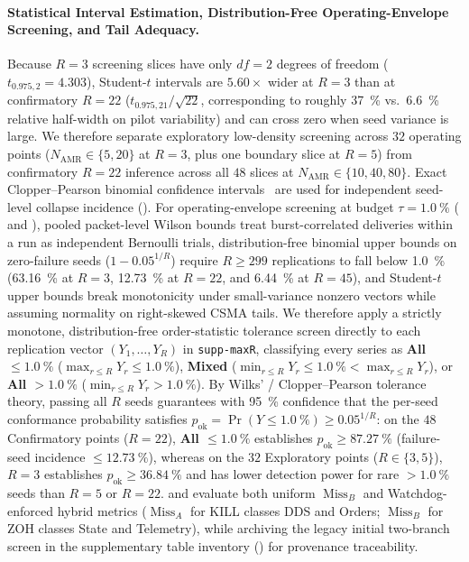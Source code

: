 \documentclass[11pt,a4paper]{article}
\newcommand{\Namr}{\ensuremath{N_{\mathrm{AMR}}}}
\newcommand{\MissA}{\ensuremath{\operatorname{Miss}_A}}
\newcommand{\MissB}{\ensuremath{\operatorname{Miss}_B}}
\begin{document}
\paragraph{Statistical Interval Estimation, Distribution-Free Operating-Envelope Screening, and Tail Adequacy.}
Because $R=3$ screening slices have only $df=2$ degrees of freedom ($t_{0.975,2} = 4.303$), Student-$t$ intervals are $5.60\times$ wider at $R=3$ than at confirmatory $R=22$ ($t_{0.975,21}/\sqrt{22}$, corresponding to roughly \qty{37}{\percent} vs.\ \qty{6.6}{\percent} relative half-width on pilot variability) and can cross zero when seed variance is large. We therefore separate exploratory low-density screening across $32$ operating points ($\Namr \in \{5, 20\}$ at $R=3$, plus one boundary slice at $R=5$) from confirmatory $R=22$ inference across all $48$ slices at $\Namr \in \{10, 40, 80\}$. Exact Clopper--Pearson binomial confidence intervals~\cite{clopper1934use} are used for independent seed-level collapse incidence (). For operating-envelope screening at budget $\tau = \qty{1.0}{\percent}$ ( and ), pooled packet-level Wilson bounds treat burst-correlated deliveries within a run as independent Bernoulli trials, distribution-free binomial upper bounds on zero-failure seeds ($1 - 0.05^{1/R}$) require $R \ge 299$ replications to fall below \qty{1.0}{\percent} (\qty{63.16}{\percent} at $R=3$, \qty{12.73}{\percent} at $R=22$, and \qty{6.44}{\percent} at $R=45$), and Student-$t$ upper bounds break monotonicity under small-variance nonzero vectors while assuming normality on right-skewed CSMA tails. We therefore apply a strictly monotone, distribution-free order-statistic tolerance screen directly to each replication vector $(Y_1, \dots, Y_R)$ in \texttt{supp-maxR}, classifying every series as \textbf{All $\le \qty{1.0}{\percent}$} ($\max_{r \le R} Y_r \le \qty{1.0}{\percent}$), \textbf{Mixed} ($\min_{r \le R} Y_r \le \qty{1.0}{\percent} < \max_{r \le R} Y_r$), or \textbf{All $> \qty{1.0}{\percent}$} ($\min_{r \le R} Y_r > \qty{1.0}{\percent}$). By Wilks' / Clopper--Pearson tolerance theory, passing all $R$ seeds guarantees with \qty{95}{\percent} confidence that the per-seed conformance probability satisfies $p_{\mathrm{ok}} = \Pr(Y \le \qty{1.0}{\percent}) \ge 0.05^{1/R}$: on the $48$ Confirmatory points ($R=22$), \textbf{All $\le \qty{1.0}{\percent}$} establishes $p_{\mathrm{ok}} \ge \qty{87.27}{\percent}$ (failure-seed incidence $\le \qty{12.73}{\percent}$), whereas on the $32$ Exploratory points ($R \in \{3, 5\}$), $R=3$ establishes $p_{\mathrm{ok}} \ge \qty{36.84}{\percent}$ and has lower detection power for rare $> \qty{1.0}{\percent}$ seeds than $R=5$ or $R=22$.  and  evaluate both uniform $\MissB$ and Watchdog-enforced hybrid metrics ($\MissA$ for KILL classes DDS and Orders; $\MissB$ for ZOH classes State and Telemetry), while archiving the legacy initial two-branch screen in the supplementary table inventory () for provenance traceability.
\end{document}
